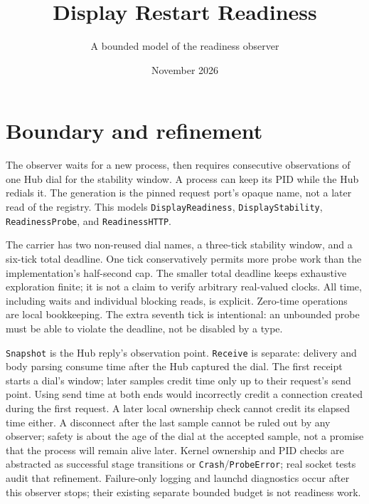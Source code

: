 \documentclass[a4paper,10pt,fleqn]{article}
\begin{document}
\title{Display Restart Readiness}
\author{A bounded model of the readiness observer}
\date{November 2026}
\maketitle

\section{Boundary and refinement}
The observer waits for a new process, then requires consecutive observations of
one Hub dial for the stability window. A process can keep its PID while the Hub
redials it. The generation is the pinned request port's opaque name, not a later
read of the registry. This models \texttt{DisplayReadiness},
\texttt{DisplayStability}, \texttt{ReadinessProbe}, and \texttt{ReadinessHTTP}.

The carrier has two non-reused dial names, a three-tick stability window, and a
six-tick total deadline. One tick conservatively permits more probe work than
the implementation's half-second cap. The smaller total deadline keeps exhaustive
exploration finite; it is not a claim to verify arbitrary real-valued clocks.
All time, including waits and individual blocking reads, is explicit. Zero-time
operations are local bookkeeping. The extra seventh tick is intentional: an
unbounded probe must be able to violate the deadline, not be disabled by a type.

\texttt{Snapshot} is the Hub reply's observation point. \texttt{Receive} is
separate: delivery and body parsing consume time after the Hub captured the dial.
The first receipt starts a dial's window; later samples credit time only up to
their request's send point. Using send time at both ends would incorrectly
credit a connection created during the first request. A later local ownership
check cannot credit its elapsed time either. A disconnect after the last
sample cannot be ruled out by any observer; safety is about the age of the dial
at the accepted sample, not a promise that the process will remain alive later.
Kernel ownership and PID checks are abstracted as successful stage transitions
or \texttt{Crash}/\texttt{ProbeError}; real socket tests audit that refinement.
Failure-only logging and launchd diagnostics occur after this observer stops;
their existing separate bounded budget is not readiness work.
\end{document}
